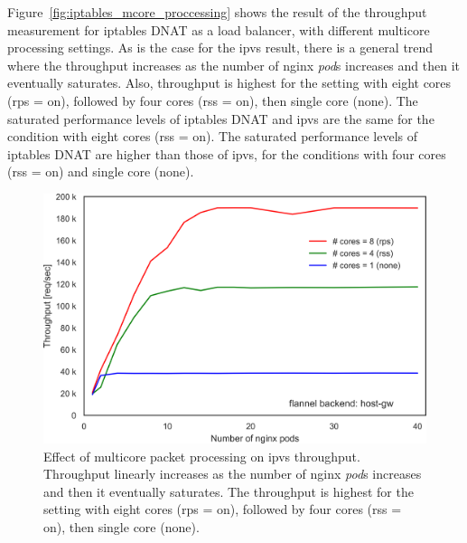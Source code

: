 Figure~\ref{fig:iptables_mcore_proccessing} shows the result of the throughput measurement for iptables DNAT as a load balancer, with different multicore processing settings.
As is the case for the ipvs result, there is a general trend where the throughput increases as the number of nginx {\em pod}s increases and then it eventually saturates.
Also, throughput is highest for the setting with eight cores (rps = on), followed by four cores (rss = on), then single core (none).
%
The saturated performance levels of iptables DNAT and ipvs are the same for the condition with eight cores (rss = on). 
The saturated performance levels of iptables DNAT are higher than those of ipvs, for the conditions with four cores (rss = on) and single core (none).

\begin{figure}[h]
  \centering
  \includegraphics[width=0.75\columnwidth]{Figs/ipvs_mcore_proccessing}
  \par\bigskip
  \centering
  \begin{minipage}{0.9\columnwidth}
    \caption[Effect of multicore packet processing on ipvs throughput]{
Effect of multicore packet processing on ipvs throughput.
Throughput linearly increases as the number of nginx {\em pod}s increases and then it eventually saturates.
The throughput is highest for the setting with eight cores (rps = on), followed by four cores (rss = on), then single core (none).
    }
    \label{fig:ipvs_mcore_proccessing}
  \end{minipage}
\end{figure}


